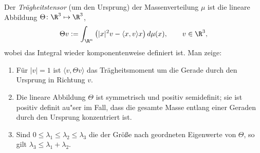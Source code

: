                 \begin{prob}[Tr\"agheitstensor]
%
Der {\em Tr\"agheitstensor} (um den Ursprung) der Massenverteilung
$\mu$ ist die lineare Abbildung $\Theta \colon \R^3 \mapsto \R^3$,
$$
\Theta v := \int_{\R^n} \left( |x|^2v - \langle x, v\rangle x \right) d\mu(x), \qquad v \in \R^3,
$$
wobei das Integral wieder komponentenweise definiert ist. Man zeige:

\begin{enumerate}[label = (\alph*)]
	\item F\"ur $|v| = 1$ ist $\langle v, \Theta v \rangle$ das Tr\"agheitsmoment um
	die Gerade durch den Ursprung in Richtung $v$.
	\item Die lineare Abbildung $\Theta$ ist symmetrisch und positiv
	semidefinit; sie ist positiv definit au"ser im Fall, dass die gesamte
	Masse entlang einer Geraden durch den Ursprung konzentriert ist.
	\item Sind $0 \le \lambda_1 \le \lambda_2 \le \lambda_3$ die der Gr\"o\ss e
	nach geordneten Eigenwerte von $\Theta$, so gilt $\lambda_3 \le \lambda_1 + \lambda_2$.
\end{enumerate}

\newpage
\vspace{2mm}
                \end{prob}
